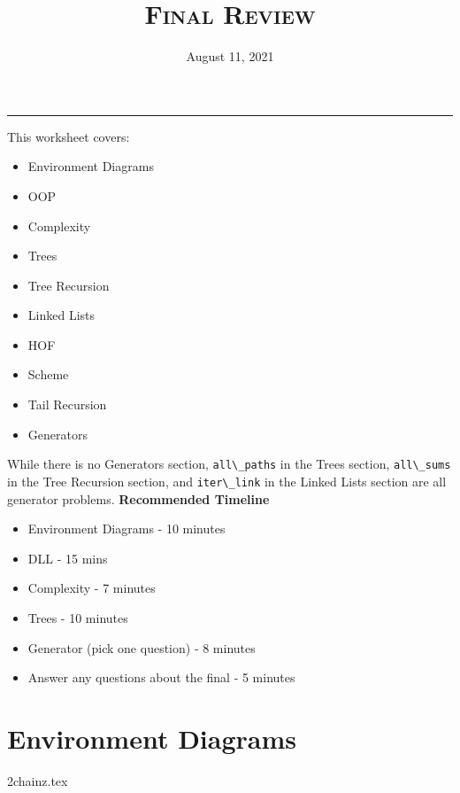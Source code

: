 \documentclass{exam}
\title{\textsc{Final Review}}
\date{August 11, 2021}
\begin{document}
\maketitle\rule{\textwidth}{0.15em}
\fontsize{12}{15}\selectfont

\begin{guide}
    This worksheet covers:
    \begin{itemize}
        \item Environment Diagrams
        \item OOP
        \item Complexity
        \item Trees
        \item Tree Recursion
        \item Linked Lists
        \item HOF
        \item Scheme
        \item Tail Recursion
        \item Generators
    \end{itemize}
    While there is no Generators section, \lstinline{all\_paths} in the Trees section, \lstinline{all\_sums} in the Tree Recursion section, and \lstinline{iter\_link} in the Linked Lists section are all generator problems.
    \newline
    \textbf{Recommended Timeline}
    \begin{itemize}
        \item Environment Diagrams - 10 minutes
        \item DLL - 15 mins
        \item Complexity - 7 minutes
        \item Trees - 10 minutes
        \item Generator (pick one question) - 8 minutes 
        \item Answer any questions about the final - 5 minutes
    \end{itemize}
\end{guide}

\section{Environment Diagrams}
\begin{questions}
{2chainz.tex}
\end{questions}
\newpage
\end{document}
